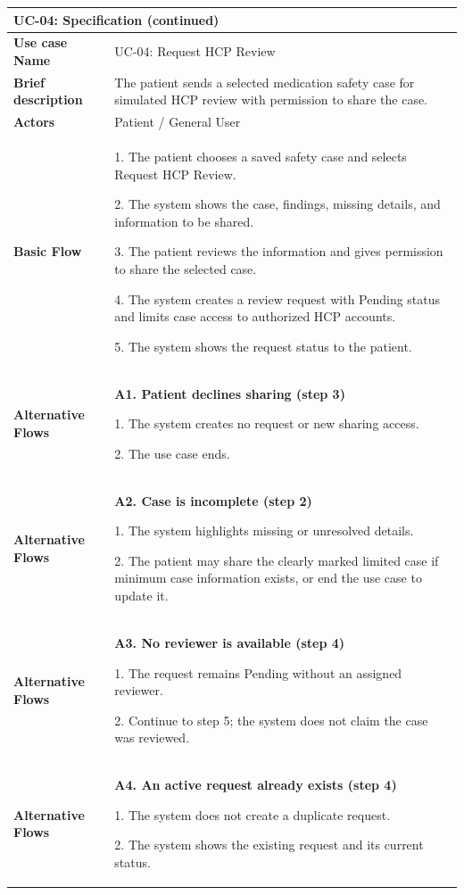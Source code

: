 \begin{longtable}{|p{}|p{}|}
\hline
\endfirsthead
\multicolumn{2}{l}{\textbf{UC-04: Specification (continued)}} \\
\hline
\endhead
\textbf{Use case Name} & UC-04: Request HCP Review \\ \hline
\textbf{Brief description} & The patient sends a selected medication safety case for simulated HCP review with permission to share the case. \\ \hline
\textbf{Actors} & Patient / General User \\ \hline
\textbf{Basic Flow} &
1. The patient chooses a saved safety case and selects Request HCP Review.\par
2. The system shows the case, findings, missing details, and information to be shared.\par
3. The patient reviews the information and gives permission to share the selected case.\par
4. The system creates a review request with Pending status and limits case access to authorized HCP accounts.\par
5. The system shows the request status to the patient.
\\ \hline
\textbf{Alternative Flows} &
\textbf{A1. Patient declines sharing (step 3)}\par
1. The system creates no request or new sharing access.\par
2. The use case ends.
\\ \hline
\textbf{Alternative Flows} &
\textbf{A2. Case is incomplete (step 2)}\par
1. The system highlights missing or unresolved details.\par
2. The patient may share the clearly marked limited case if minimum case information exists, or end the use case to update it.
\\ \hline
\textbf{Alternative Flows} &
\textbf{A3. No reviewer is available (step 4)}\par
1. The request remains Pending without an assigned reviewer.\par
2. Continue to step 5; the system does not claim the case was reviewed.
\\ \hline
\textbf{Alternative Flows} &
\textbf{A4. An active request already
exists (step 4)}\par
1. The system does not create
a duplicate request.\par
2. The system shows the existing
request and its current status.\par

\end{longtable}
